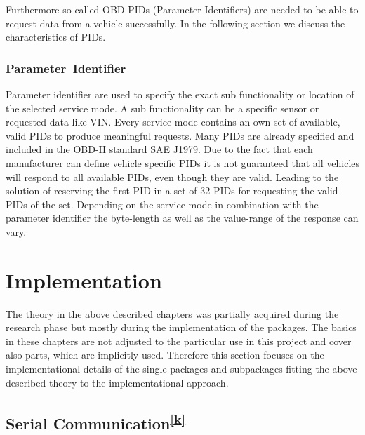 {Furthermore so called OBD PIDs (Parameter Identifiers) are needed to be
able to request data from a vehicle successfully. In the following
section we discuss the characteristics of PIDs.}

\hypertarget{h.zg0lajxcv3vk}{\subsubsection{\texorpdfstring{{Parameter}{~Identifier}}{Parameter~Identifier}}\label{h.zg0lajxcv3vk}}

{Parameter identifier are used to specify the exact sub functionality or
location of the selected service mode. A sub functionality can be a
specific sensor or requested data like VIN. Every service mode contains
an own set of available, valid PIDs to produce meaningful requests. Many
PIDs are already specified and included in the OBD-II standard SAE
J1979. Due to the fact that each manufacturer can define vehicle
specific PIDs it is not guaranteed that all vehicles will respond to all
available PIDs, even though they are valid. Leading to the solution of
reserving the first PID in a set of 32 PIDs for requesting the valid
PIDs of the set. Depending on the service mode in combination with the
parameter identifier the byte-length as well as the value-range of the
response can vary. }

\hypertarget{h.k3ecyfg5l7ib}{\section{\texorpdfstring{{Implementation}}{Implementation}}\label{h.k3ecyfg5l7ib}}

{The theory in the above described chapters was partially acquired
during the research phase but mostly during the implementation of the
packages. The basics in these chapters are not adjusted to the
particular use in this project and cover also parts, which are
implicitly used. Therefore this section focuses on the implementational
details of the single packages and subpackages fitting the above
described theory to the implementational approach.}

\hypertarget{h.o5tk1rwy6zuu}{\subsection{\texorpdfstring{{Serial
}{Communication}\textsuperscript{\protect\hyperlink{cmnt11}{{[}k{]}}}}{Serial Communication{[}k{]}}}\label{h.o5tk1rwy6zuu}}

